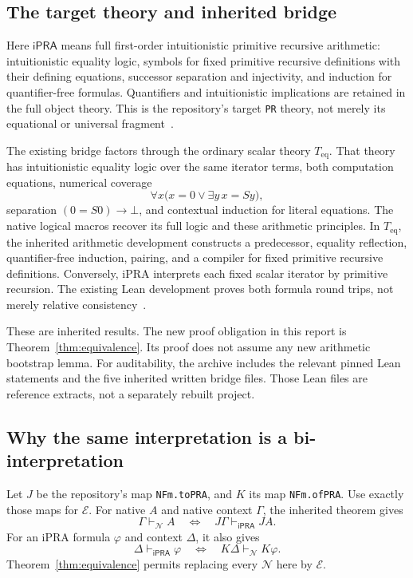 \documentclass[11pt]{article}
\theoremstyle{definition}
\newcommand{\E}{\mathcal E}
\newcommand{\N}{\mathcal N}
\newcommand{\ipra}{\mathsf{iPRA}}
\begin{document}
\subsection{The target theory and inherited bridge}

Here $\ipra$ means full first-order intuitionistic primitive recursive
arithmetic: intuitionistic equality logic, symbols for fixed primitive
recursive definitions with their defining equations, successor separation
and injectivity, and induction for quantifier-free formulas. Quantifiers
and intuitionistic implications are retained in the full object theory.
This is the repository's target \texttt{PR} theory, not merely its
equational or universal fragment~\cite{repo,biinterp}.

The existing bridge factors through the ordinary scalar theory
$T_{\mathrm{eq}}$. That theory has intuitionistic equality logic over
the same iterator terms, both computation equations, numerical coverage
\[
 \forall x\bigl(x=0\vee\exists y\,x=Sy\bigr),
\]
separation $(0=S0)\to\bot$, and contextual induction for literal equations.
The native logical macros recover its full logic and these arithmetic
principles. In $T_{\mathrm{eq}}$, the inherited arithmetic development
constructs a predecessor, equality reflection, quantifier-free induction,
pairing, and a compiler for fixed primitive recursive definitions.
Conversely, iPRA interprets each fixed scalar iterator by primitive
recursion. The existing Lean development proves both formula round trips,
not merely relative consistency~\cite{repo,biinterp}.

These are inherited results. The new proof obligation in this report is
Theorem~\ref{thm:equivalence}. Its proof does not assume any new arithmetic
bootstrap lemma. For auditability, the archive includes the relevant
pinned Lean statements and the five inherited written bridge files.
Those Lean files are reference extracts, not a separately rebuilt project.

\subsection{Why the same interpretation is a bi-interpretation}

Let $J$ be the repository's map \texttt{NFm.toPRA}, and $K$ its map
\texttt{NFm.ofPRA}. Use exactly those maps for $\E$. For native $A$ and
native context $\Gamma$, the inherited theorem gives
\[
 \Gamma\vdash_\N A
 \quad\Longleftrightarrow\quad
 J\Gamma\vdash_\ipra JA.
\]
For an iPRA formula $\varphi$ and context $\Delta$, it also gives
\[
 \Delta\vdash_\ipra\varphi
 \quad\Longleftrightarrow\quad
 K\Delta\vdash_\N K\varphi.
\]
Theorem~\ref{thm:equivalence} permits replacing every $\N$ here by $\E$.
\end{document}

